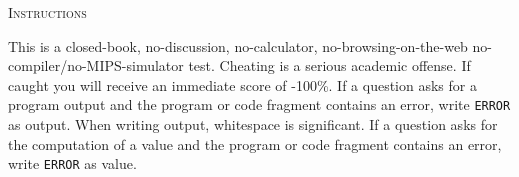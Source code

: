 \textsc{Instructions}
\begin{enumerate}
\li This is a closed-book, no-discussion, no-calculator, no-browsing-on-the-web
    no-compiler/no-MIPS-simulator test.
\li Cheating is a serious academic offense. If caught you will 
    receive an immediate score of -100\%.
\li If a question asks for a program output and the program or
    code fragment contains
    an error, write \verb!ERROR! as output.
    When writing output, whitespace is significant.
\li If a question asks for the computation of a value and the program or
    code fragment contains
    an error, write \verb!ERROR! as value.
\end{enumerate}

\vspace{1cm}
